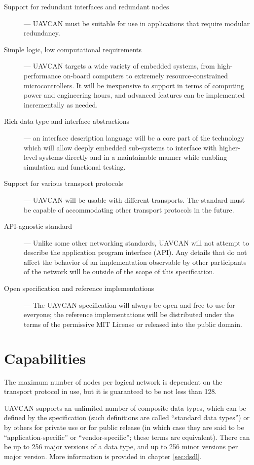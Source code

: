 \begin{description}
    \item[Support for redundant interfaces and redundant nodes] --- UAVCAN must be suitable for use in
    applications that require modular redundancy.

    \item[Simple logic, low computational requirements] --- UAVCAN targets a wide variety of embedded systems,
    from high-performance on-board computers to extremely resource-constrained microcontrollers.
    It will be inexpensive to support in terms of computing power and engineering hours,
    and advanced features can be implemented incrementally as needed.

    \item[Rich data type and interface abstractions] --- an interface description language will be a core part of
    the technology which will allow deeply embedded sub-systems to interface with higher-level systems directly and
    in a maintainable manner while enabling simulation and functional testing.

    \item[Support for various transport protocols] --- UAVCAN will be usable with different transports.
    The standard must be capable of accommodating other transport protocols in the future.

    \item[API-agnostic standard] --- Unlike some other networking standards, UAVCAN will not attempt to describe
    the application program interface (API). Any details that do not affect the behavior of an implementation
    observable by other participants of the network will be outside of the scope of this specification.

    \item[Open specification and reference implementations] --- The UAVCAN specification will always be open and
    free to use for everyone; the reference implementations will be distributed under the terms of
    the permissive MIT License or released into the public domain.
\end{description}

\section{Capabilities}

The maximum number of nodes per logical network is dependent on the transport protocol in use,
but it is guaranteed to be not less than 128.

UAVCAN supports an unlimited number of composite data types,
which can be defined by the specification (such definitions are called ``standard data types'')
or by others for private use or for public release
(in which case they are said to be ``application-specific'' or ``vendor-specific''; these terms are equivalent).
There can be up to 256 major versions of a data type, and up to 256 minor versions per major version.
More information is provided in chapter \ref{sec:dsdl}.

